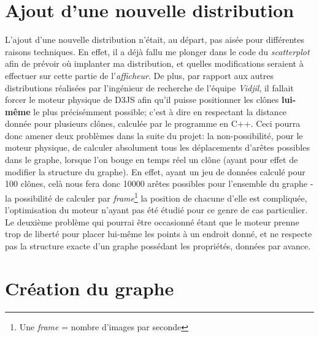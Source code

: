 \documentclass[12pt]{report}
\begin{document}
\begin{spacing}{1.2}
\section{Ajout d'une nouvelle distribution}
L'ajout d'une nouvelle distribution n'était, au départ, pas aisée pour différentes raisons techniques.
\newline
En effet, il a déjà fallu me plonger dans le code du \textit{scatterplot} afin de prévoir où implanter ma distribution, et quelles modifications seraient à effectuer sur cette partie de l'\textit{afficheur}.
\newline
De plus, par rapport aux autres distributions réalisées par l'ingénieur de recherche de l'équipe \textit{Vidjil}, il fallait forcer le moteur physique de D3JS afin qu'il puisse positionner les clônes \textbf{lui-même} le plus précisémment possible; c'est à dire en respectant la distance donnée pour plusieurs clônes, calculée par le programme en C++.
\newline
Ceci pourra donc amener deux problèmes dans la suite du projet: la non-possibilité, pour le moteur physique, de calculer absolument tous les déplacements d'arêtes possibles dans le graphe, lorsque l'on bouge en temps réel un clône (ayant pour effet de modifier la structure du graphe). En effet, ayant un jeu de données calculé pour 100 clônes, celà nous fera donc 10000 arêtes possibles pour l'ensemble du graphe - la possibilité de calculer par \textit{frame}\footnote{Une \textit{frame} = nombre d'images par seconde} la position de chacune d'elle est compliquée, l'optimisation du moteur n'ayant pas été étudié pour ce genre de cas particulier. Le deuxième problème qui pourrai être occasionné étant que le moteur prenne trop de liberté pour placer lui-même les points à un endroit donné, et ne respecte pas la structure exacte d'un graphe possédant les propriétés, données par avance.

\section{Création du graphe}


\end{spacing}
\end{document}
